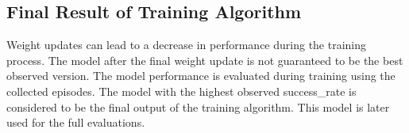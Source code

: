 \subsection{Final Result of Training Algorithm}

Weight updates can lead to a decrease in performance during the training process. The model after the final weight update is not guaranteed to be the best observed version.
The model performance is evaluated during training using the collected episodes. The model with the highest observed success\_rate is considered to be the final output of the training algorithm. This model is later used for the full evaluations.

